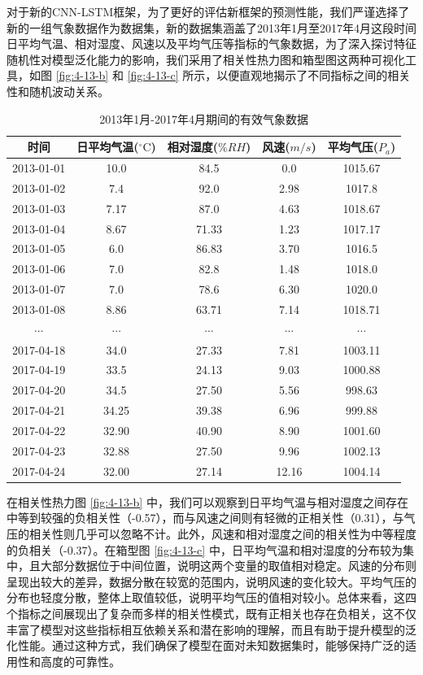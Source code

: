 对于新的CNN-LSTM框架，为了更好的评估新框架的预测性能，我们严谨选择了新的一组气象数据作为数据集，新的数据集涵盖了2013年1月至2017年4月这段时间日平均气温、相对湿度、风速以及平均气压等指标的气象数据，为了深入探讨特征随机性对模型泛化能力的影响，我们采用了相关性热力图和箱型图这两种可视化工具，如图 \ref{fig:4-13-b} 和 \ref{fig:4-13-c} 所示，以便直观地揭示了不同指标之间的相关性和随机波动关系。

\begin{table}[h]
    \caption{2013年1月-2017年4月期间的有效气象数据}\label{tab:CNN_LSTM_data}
    \centering
    \resizebox{0.8\linewidth}{!}
    {\begin{tabular}{*5{c}}\toprule
        时间 & 日平均气温(${}^{\circ}\text{C}$) & 相对湿度($\%RH$) & 风速($m/s$)  & 平均气压($P_a$) \\ 
        \midrule
        2013-01-01 & 10.0 & 84.5 & 0.0 & 1015.67 \\
        2013-01-02 & 7.4 & 92.0 & 2.98 & 1017.8 \\
        2013-01-03 & 7.17 & 87.0 & 4.63 & 1018.67 \\
        2013-01-04 & 8.67 & 71.33 & 1.23 & 1017.17 \\
        2013-01-05 & 6.0 & 86.83 & 3.70 & 1016.5 \\
        2013-01-06 & 7.0 & 82.8 & 1.48 & 1018.0 \\
        2013-01-07 & 7.0 & 78.6 & 6.30 & 1020.0 \\
        2013-01-08 & 8.86 & 63.71 & 7.14 & 1018.71 \\
        $\cdots$ & $\cdots$ & $\cdots$ & $\cdots$ & $\cdots$ \\
        2017-04-18 & 34.0 & 27.33 & 7.81 & 1003.11 \\
        2017-04-19 & 33.5 & 24.13 & 9.03 & 1000.88 \\
        2017-04-20 & 34.5 & 27.50 & 5.56 & 998.63 \\
        2017-04-21 & 34.25 & 39.38 & 6.96 & 999.88 \\
        2017-04-22 & 32.90 & 40.90 & 8.90 & 1001.60 \\
        2017-04-23 & 32.88 & 27.50 & 9.96 & 1002.13 \\
        2017-04-24 & 32.00 & 27.14 & 12.16 & 1004.14 \\
        \bottomrule
    \end{tabular}}
\end{table}

在相关性热力图 \ref{fig:4-13-b} 中，我们可以观察到日平均气温与相对湿度之间存在中等到较强的负相关性（-0.57），而与风速之间则有轻微的正相关性（0.31），与气压的相关性则几乎可以忽略不计。此外，风速和相对湿度之间的相关性为中等程度的负相关（-0.37）。在箱型图 \ref{fig:4-13-c} 中，日平均气温和相对湿度的分布较为集中，且大部分数据位于中间位置，说明这两个变量的取值相对稳定。风速的分布则呈现出较大的差异，数据分散在较宽的范围内，说明风速的变化较大。平均气压的分布也轻度分散，整体上取值较低，说明平均气压的值相对较小。总体来看，这四个指标之间展现出了复杂而多样的相关性模式，既有正相关也存在负相关，这不仅丰富了模型对这些指标相互依赖关系和潜在影响的理解，而且有助于提升模型的泛化性能。通过这种方式，我们确保了模型在面对未知数据集时，能够保持广泛的适用性和高度的可靠性。


